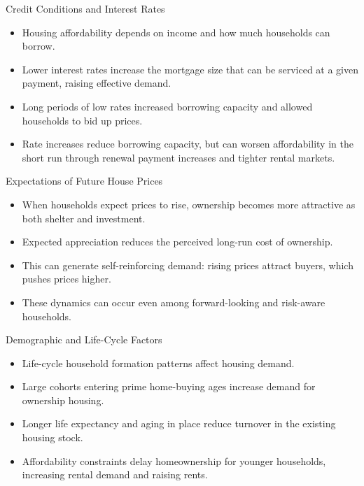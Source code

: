 \documentclass[aspectratio=169]{beamer}
\begin{document}
\begin{frame}{Credit Conditions and Interest Rates}
\transfade
\begin{itemize}
  \item Housing affordability depends on income and how much households can borrow.
  \item Lower interest rates increase the mortgage size that can be serviced at a given payment, raising effective demand.
  \item Long periods of low rates increased borrowing capacity and allowed households to bid up prices.
  \item Rate increases reduce borrowing capacity, but can worsen affordability in the short run through renewal payment increases and tighter rental markets.
\end{itemize}
\end{frame}

\begin{frame}{Expectations of Future House Prices}
\transfade
\begin{itemize}
  \item When households expect prices to rise, ownership becomes more attractive as both shelter and investment.
  \item Expected appreciation reduces the perceived long-run cost of ownership.
  \item This can generate self-reinforcing demand: rising prices attract buyers, which pushes prices higher.
  \item These dynamics can occur even among forward-looking and risk-aware households.
\end{itemize}
\end{frame}

\begin{frame}{Demographic and Life-Cycle Factors}
\transfade
\begin{itemize}
  \item Life-cycle household formation patterns affect housing demand.
  \item Large cohorts entering prime home-buying ages increase demand for ownership housing.
  \item Longer life expectancy and aging in place reduce turnover in the existing housing stock.
  \item Affordability constraints delay homeownership for younger households, increasing rental demand and raising rents.
\end{itemize}
\end{frame}
\end{document}
